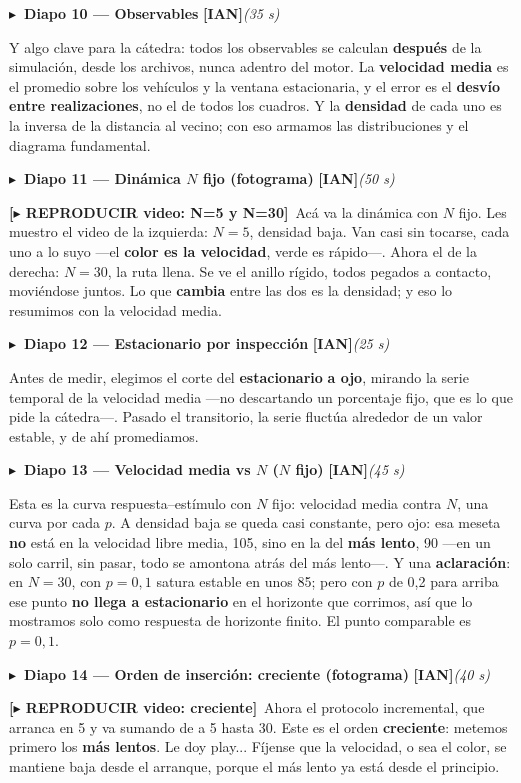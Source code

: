 \documentclass[11pt,a4paper]{article}
\newcommand{\diapo}[5]{%
  \medskip\par\noindent
  \textcolor{#4}{\textbf{$\blacktriangleright$\ Diapo #1 --- #2}}\quad
  \textcolor{#4}{\textbf{[#3]}}\hfill{\itshape\small(#5)}\par\nobreak\smallskip
}
\newcommand{\videocue}[1]{\textcolor{cian!85!black}{\textbf{[$\blacktriangleright$ REPRODUCIR video: #1]}}\ }
\begin{document}
\diapo{10}{Observables}{IAN}{cian}{35 s}
Y algo clave para la cátedra: todos los observables se calculan \textbf{después} de la simulación, desde los
archivos, nunca adentro del motor. La \textbf{velocidad media} es el promedio sobre los vehículos y la ventana
estacionaria, y el error es el \textbf{desvío entre realizaciones}, no el de todos los cuadros. Y la
\textbf{densidad} de cada uno es la inversa de la distancia al vecino; con eso armamos las distribuciones y el
diagrama fundamental.

\diapo{11}{Dinámica $N$ fijo (fotograma)}{IAN}{cian}{50 s}
\videocue{N=5 y N=30}Acá va la dinámica con $N$ fijo. Les muestro el video de la izquierda: \textbf{$N=5$},
densidad baja. Van casi sin tocarse, cada uno a lo suyo ---el \textbf{color es la velocidad}, verde es rápido---.
Ahora el de la derecha: \textbf{$N=30$}, la ruta llena. Se ve el anillo rígido, todos pegados a contacto,
moviéndose juntos. Lo que \textbf{cambia} entre las dos es la densidad; y eso lo resumimos con la velocidad media.

\diapo{12}{Estacionario por inspección}{IAN}{cian}{25 s}
Antes de medir, elegimos el corte del \textbf{estacionario} \textbf{a ojo}, mirando la serie temporal de la
velocidad media ---no descartando un porcentaje fijo, que es lo que pide la cátedra---. Pasado el transitorio, la
serie fluctúa alrededor de un valor estable, y de ahí promediamos.

\diapo{13}{Velocidad media vs $N$ ($N$ fijo)}{IAN}{cian}{45 s}
Esta es la curva respuesta--estímulo con $N$ fijo: velocidad media contra $N$, una curva por cada $p$. A densidad
baja se queda casi constante, pero ojo: esa meseta \textbf{no} está en la velocidad libre media, 105, sino en la
del \textbf{más lento}, 90 ---en un solo carril, sin pasar, todo se amontona atrás del más lento---. Y una
\textbf{aclaración}: en $N=30$, con $p=0{,}1$ satura estable en unos 85; pero con $p$ de 0,2 para arriba ese punto
\textbf{no llega a estacionario} en el horizonte que corrimos, así que lo mostramos solo como respuesta de
horizonte finito. El punto comparable es $p=0{,}1$.

\diapo{14}{Orden de inserción: creciente (fotograma)}{IAN}{cian}{40 s}
\videocue{creciente}Ahora el protocolo incremental, que arranca en 5 y va sumando de a 5 hasta 30. Este es el
orden \textbf{creciente}: metemos primero los \textbf{más lentos}. Le doy play... Fíjense que la velocidad, o sea
el color, se mantiene baja desde el arranque, porque el más lento ya está desde el principio.
\end{document}
